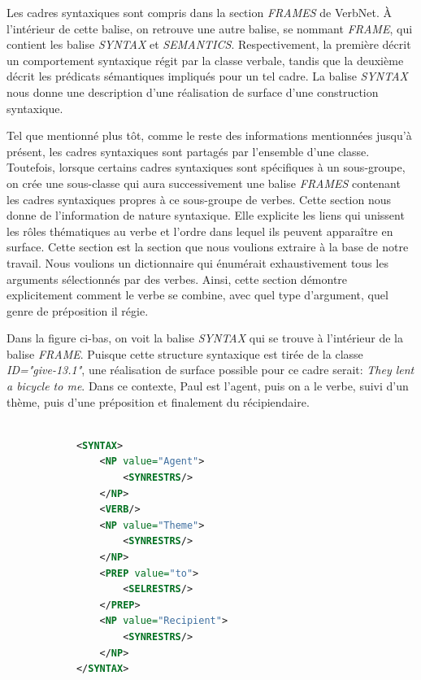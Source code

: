 Les cadres syntaxiques sont compris dans la section \emph{FRAMES} de VerbNet. À l'intérieur de cette balise, on retrouve une autre balise, se nommant \emph{FRAME}, qui contient les balise \emph{SYNTAX} et \emph{SEMANTICS}. Respectivement, la première décrit un comportement syntaxique régit par la classe verbale, tandis que la deuxième décrit les prédicats sémantiques impliqués pour un tel cadre. La balise \emph{SYNTAX} nous donne une description d'une réalisation de surface d'une construction syntaxique.

Tel que mentionné plus tôt, comme le reste des informations mentionnées jusqu'à présent, les cadres syntaxiques sont partagés par l'ensemble d'une classe. Toutefois, lorsque certains cadres syntaxiques sont spécifiques à un sous-groupe, on crée une sous-classe qui aura successivement une balise \emph{FRAMES} contenant les cadres syntaxiques propres à ce sous-groupe de verbes. Cette section nous donne de l'information de nature syntaxique. Elle explicite les liens qui unissent les rôles thématiques au verbe et l'ordre dans lequel ils peuvent apparaître en surface. Cette section est la section que nous voulions extraire à la base de notre travail. Nous voulions un dictionnaire qui énumérait exhaustivement tous les arguments sélectionnés par des verbes. Ainsi, cette section démontre explicitement comment le verbe se combine, avec quel type d'argument, quel genre de préposition il régie. 

Dans la figure ci-bas, on voit la balise \emph{SYNTAX} qui se trouve à l'intérieur de la balise \emph{FRAME}. Puisque cette structure syntaxique est tirée de la classe \emph{ID="give-13.1"}, une réalisation de surface possible pour ce cadre serait: \emph{They lent a bicycle to me}. Dans ce contexte, Paul est l'agent, puis on a le verbe, suivi d'un thème, puis d'une préposition et finalement du récipiendaire. 

\begin{lstlisting}[language=Xml, caption = cadres syntaxiques]

            <SYNTAX>
                <NP value="Agent">
                    <SYNRESTRS/>
                </NP>
                <VERB/>
                <NP value="Theme">
                    <SYNRESTRS/>
                </NP>
                <PREP value="to">
                    <SELRESTRS/>
                </PREP>
                <NP value="Recipient">
                    <SYNRESTRS/>
                </NP>
            </SYNTAX>
\end{lstlisting}

